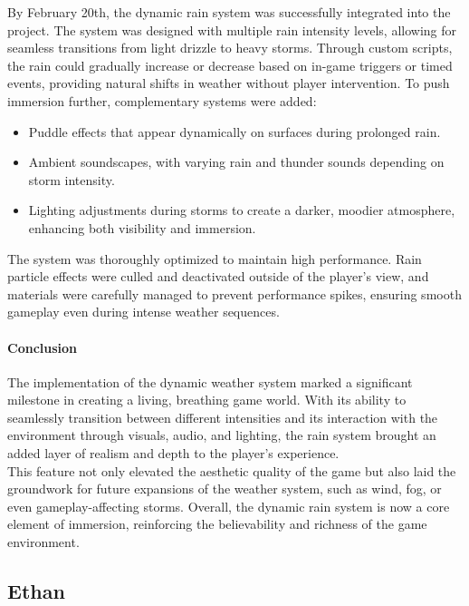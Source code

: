 \documentclass{article}
\begin{document}
By February 20th, the dynamic rain system was successfully integrated into the project. The system was designed with multiple rain intensity levels, allowing for seamless transitions from light drizzle to heavy storms. Through custom scripts, the rain could gradually increase or decrease based on in-game triggers or timed events, providing natural shifts in weather without player intervention. To push immersion further, complementary systems were added:
\begin{itemize}
    \item Puddle effects that appear dynamically on surfaces during prolonged rain.
    \item Ambient soundscapes, with varying rain and thunder sounds depending on storm intensity.
    \item Lighting adjustments during storms to create a darker, moodier atmosphere, enhancing both visibility and immersion.
\end{itemize}

The system was thoroughly optimized to maintain high performance. Rain particle effects were culled and deactivated outside of the player's view, and materials were carefully managed to prevent performance spikes, ensuring smooth gameplay even during intense weather sequences.

\paragraph{Conclusion}\hfill

The implementation of the dynamic weather system marked a significant milestone in creating a living, breathing game world. With its ability to seamlessly transition between different intensities and its interaction with the environment through visuals, audio, and lighting, the rain system brought an added layer of realism and depth to the player's experience.\\

This feature not only elevated the aesthetic quality of the game but also laid the groundwork for future expansions of the weather system, such as wind, fog, or even gameplay-affecting storms. Overall, the dynamic rain system is now a core element of immersion, reinforcing the believability and richness of the game environment.





\newpage
\subsection{Ethan}\hfill
\end{document}

